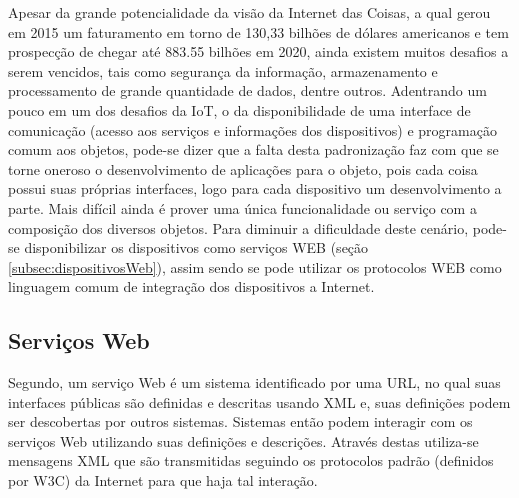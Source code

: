 Apesar da grande potencialidade da visão da Internet das Coisas, a qual gerou em 2015 um faturamento em torno de 130,33 bilhões de dólares americanos e tem prospecção de chegar até 883.55 bilhões em 2020\footnotemark {}, ainda existem muitos desafios a serem vencidos, tais como segurança da informação, armazenamento e processamento de grande quantidade de dados, dentre outros. Adentrando um pouco em um dos desafios da IoT, o da disponibilidade de uma interface de comunicação (acesso aos serviços e informações dos dispositivos) e programação comum aos objetos, pode-se dizer que a falta desta padronização faz com que se torne oneroso o desenvolvimento de aplicações para o objeto, pois cada coisa possui suas próprias interfaces, logo para cada dispositivo um desenvolvimento a parte. Mais difícil ainda é prover uma única funcionalidade ou serviço com a composição dos diversos objetos. Para diminuir a dificuldade deste cenário, pode-se disponibilizar os dispositivos como serviços WEB (seção \ref{subsec:dispositivosWeb}), assim sendo se pode utilizar os protocolos WEB como linguagem comum de integração dos dispositivos a Internet.\cite{Franca:2011}

\subsection{Serviços Web}
\label{ws:webservices}
Segundo\cite{Dustdar:2005}, um serviço Web é um sistema identificado por uma URL\footnotemark {}, no qual suas interfaces públicas são definidas e descritas usando XML\footnotemark {} e, suas definições podem ser descobertas por outros sistemas. Sistemas então podem interagir com os serviços Web utilizando suas definições e descrições. Através destas utiliza-se mensagens XML que são transmitidas seguindo os protocolos padrão (definidos por W3C\footnotemark {}) da Internet para que haja tal interação.

